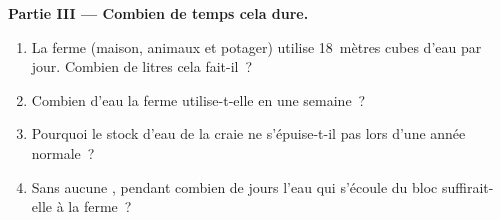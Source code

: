 \begin{problem}
\medskip
\noindent\textbf{Partie III --- Combien de temps cela dure.}
\begin{enumerate}[resume]
  \item La ferme (maison, animaux et potager) utilise 18~mètres cubes
        d'eau par jour. Combien de litres cela fait-il~?
  \item Combien d'eau la ferme utilise-t-elle en une semaine~?
  \item Pourquoi le stock d'eau de la craie ne s'épuise-t-il pas lors
        d'une année normale~?
  \item Sans aucune , pendant combien de jours l'eau qui s'écoule du
        bloc suffirait-elle à la ferme~?
\end{enumerate}
\end{problem}
